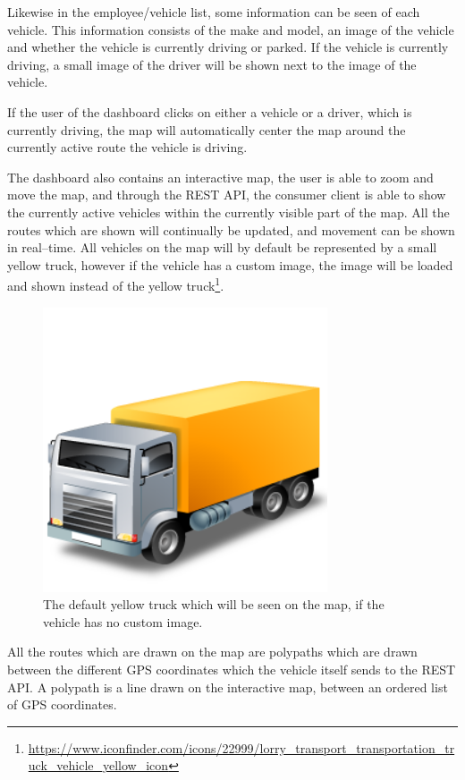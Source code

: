 Likewise in the employee/vehicle list, some information can be seen of each vehicle.
This information consists of the make and model, an image of the vehicle and whether the vehicle is currently driving or parked.
If the vehicle is currently driving, a small image of the driver will be shown next to the image of the vehicle.

If the user of the dashboard clicks on either a vehicle or a driver, which is currently driving, the map will automatically center the map around the currently active route the vehicle is driving.

\bigskip
The dashboard also contains an interactive map, the user is able to zoom and move the map, and through the REST API, the consumer client is able to show the currently active vehicles within the currently visible part of the map.
All the routes which are shown will continually be updated, and movement can be shown in real--time.
All vehicles on the map will by default be represented by a small yellow truck, however if the vehicle has a custom image, the image will be loaded and shown instead of the yellow truck\footnote{\url{https://www.iconfinder.com/icons/22999/lorry_transport_transportation_truck_vehicle_yellow_icon}}.

\begin{figure}[h]
    \centering
    \includegraphics[width=0.75\textwidth]{img/Truck_Yellow.png}
    \caption{The default yellow truck which will be seen on the map, if the vehicle has no custom image.}
    \label{fig:ConsumerClientYellowTruck}
\end{figure}

All the routes which are drawn on the map are polypaths which are drawn between the different GPS coordinates which the vehicle itself sends to the REST API.
A polypath is a line drawn on the interactive map, between an ordered list of GPS coordinates.


